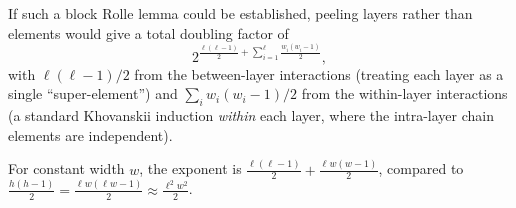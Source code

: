 If such a block Rolle lemma could be established, peeling layers rather than elements would give a total doubling factor of
\begin{equation}\label{eq:block-rolle-exponent}
  2^{\frac{\ell(\ell-1)}{2} + \sum_{i=1}^{\ell} \frac{w_i(w_i-1)}{2}},
\end{equation}
with $\ell(\ell-1)/2$ from the between-layer interactions (treating each layer as a single ``super-element'') and $\sum_i w_i(w_i-1)/2$ from the within-layer interactions (a standard Khovanskii induction \emph{within} each layer, where the intra-layer chain elements are independent).

For constant width $w$, the exponent is $\frac{\ell(\ell-1)}{2} + \frac{\ell w(w-1)}{2}$, compared to $\frac{h(h-1)}{2} = \frac{\ell w(\ell w - 1)}{2} \approx \frac{\ell^2 w^2}{2}$.

